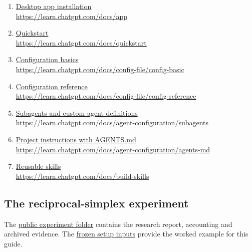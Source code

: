\documentclass[11pt,a4paper]{article}
\begin{document}
\begin{enumerate}[label=\arabic*.]
\item \href{https://learn.chatgpt.com/docs/app}{Desktop app installation}\\
\url{https://learn.chatgpt.com/docs/app}
\item \href{https://learn.chatgpt.com/docs/quickstart}{Quickstart}\\
\url{https://learn.chatgpt.com/docs/quickstart}
\item \href{https://learn.chatgpt.com/docs/config-file/config-basic}{Configuration basics}\\
\url{https://learn.chatgpt.com/docs/config-file/config-basic}
\item \href{https://learn.chatgpt.com/docs/config-file/config-reference}{Configuration reference}\\
\url{https://learn.chatgpt.com/docs/config-file/config-reference}
\item \href{https://learn.chatgpt.com/docs/agent-configuration/subagents}{Subagents and custom agent definitions}\\
\url{https://learn.chatgpt.com/docs/agent-configuration/subagents}
\item \href{https://learn.chatgpt.com/docs/agent-configuration/agents-md}{Project instructions with AGENTS.md}\\
\url{https://learn.chatgpt.com/docs/agent-configuration/agents-md}
\item \href{https://learn.chatgpt.com/docs/build-skills}{Reusable skills}\\
\url{https://learn.chatgpt.com/docs/build-skills}
\end{enumerate}

\subsection*{The reciprocal-simplex experiment}
The \href{https://github.com/MathisRost/agentic-ai-math/tree/main/experiments/reciprocal-simplex-astra6}{public experiment folder} contains the research report, accounting and archived evidence. The \href{https://github.com/MathisRost/agentic-ai-math/tree/9593db57d32ed993a645f72159ea8f002b300049/experiments/reciprocal-simplex-astra6/archive/inputs}{frozen setup inputs} provide the worked example for this guide.
\end{document}
